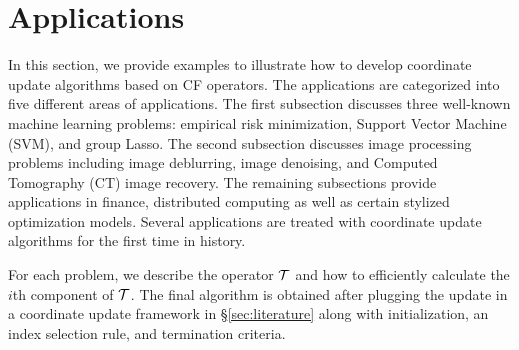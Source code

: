 \section{Applications}\label{sec:applications}
In this section, we provide examples to illustrate how to develop coordinate update algorithms based on CF operators. The applications are categorized into five different areas of applications. The first subsection discusses three well-known machine learning problems: empirical risk minimization, Support Vector Machine (SVM), and group Lasso. The second subsection  discusses image processing problems including image deblurring, image denoising, and  Computed Tomography (CT) image recovery. The remaining subsections provide applications in finance, distributed computing as well as certain stylized optimization models. Several applications are treated with coordinate update algorithms for the first time in history. 
\DIFaddbegin 

For each problem, we describe the operator ${\mathcal{T}}$ and how to efficiently calculate the $i$th component of ${\mathcal{T}}$. The final algorithm is obtained after plugging the update in a coordinate update framework in \S\ref{sec:literature} along with  initialization, an index selection rule, and termination criteria.
